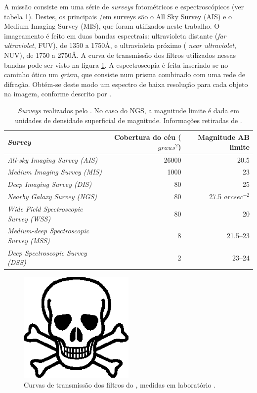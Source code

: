A missão consiste em uma série de {\em surveys} fotométricos e espectroscópicos
(ver tabela \ref{tab:GalexSurveys}). Destes, os principais {/em surveys} são o
All Sky Survey (AIS) e o Medium Imaging Survey (MIS), que foram utilizados neste
trabalho. O imageamento é feito em duas bandas espectrais: ultravioleta distante
({\em far ultraviolet}, FUV), de 1350 a 1750\AA, e ultravioleta próximo ({\em
near ultraviolet}, NUV), de 1750 a 2750\AA. A curva de transmissão dos filtros
utilizados nessas bandas pode ser visto na figura \ref{fig:GalexFilters}. A
espectroscopia é feita inserindo-se no caminho ótico um {\em grism}, que
consiste num prisma combinado com uma rede de difração. Obtém-se deste modo um
espectro de baixa resolução para cada objeto na imagem, conforme descrito por
\cite{Morrissey2007}.

\begin{table}
	\caption[{\em Surveys} realizados pelo \galex.]{{\em Surveys} realizados pelo
	\galex. No caso do NGS, a magnitude limite é dada em unidades de densidade
	superficial de magnitude. Informações retiradas de \cite{Martin2005}.}
	\begin{tabular}{l r r}
		{\em Survey} & Cobertura do céu ($graus^2$) & Magnitude AB limite \\ 
		\midrule
		{\em All-sky Imaging Survey (AIS)} & 26000 & 20.5 \\
		{\em Medium Imaging Survey (MIS)} & 1000 & 23 \\
		{\em Deep Imaging Survey (DIS)} & 80 & 25 \\
		{\em Nearby Galaxy Survey (NGS)} & 80 & 27.5 $arcsec^{-2}$  \\
		{\em Wide Field Spectroscopic Survey (WSS)} & 80 & 20 \\
		{\em Medium-deep Spectroscopic Survey (MSS)} & 8 & 21.5--23 \\
		{\em Deep Spectroscopic Survey (DSS)} & 2 & 23--24 \\
	\end{tabular}
	\label{tab:GalexSurveys}
\end{table}

\begin{figure}
	\includegraphics[width=0.5\textwidth]{figuras/test.eps}
	\caption[Curvas de transmissão dos filtros do \galex.]
	{Curvas de transmissão dos filtros do \galex, medidas em
	laboratório \citep{Morrissey2005}.}
	\label{fig:GalexFilters}
\end{figure}




